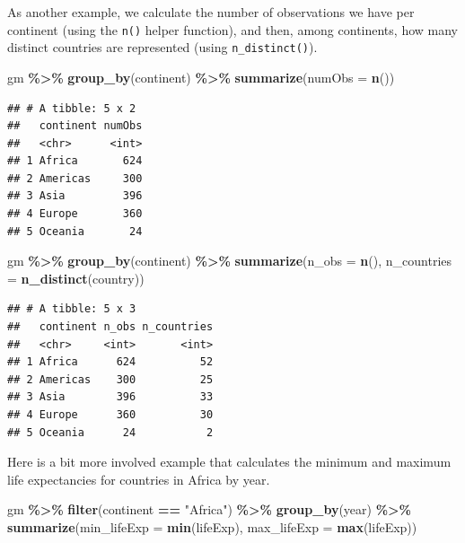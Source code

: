 \documentclass[
]{krantz}
\newenvironment{Shaded}{\begin{snugshade}}{\end{snugshade}}
\newcommand{\DataTypeTok}[1]{\textcolor[rgb]{0.13,0.29,0.53}{#1}}
\newcommand{\KeywordTok}[1]{\textcolor[rgb]{0.13,0.29,0.53}{\textbf{#1}}}
\newcommand{\NormalTok}[1]{#1}
\newcommand{\OperatorTok}[1]{\textcolor[rgb]{0.81,0.36,0.00}{\textbf{#1}}}
\newcommand{\StringTok}[1]{\textcolor[rgb]{0.31,0.60,0.02}{#1}}
\begin{document}
As another example, we calculate the number of observations we have per continent (using the \texttt{n()} helper function), and then, among continents, how many distinct countries are represented (using \texttt{n\_distinct()}).

\begin{Shaded}
\begin{Highlighting}[]
\NormalTok{gm }\OperatorTok{\%\textgreater{}\%}\StringTok{ }
\StringTok{  }\KeywordTok{group\_by}\NormalTok{(continent) }\OperatorTok{\%\textgreater{}\%}\StringTok{ }
\StringTok{  }\KeywordTok{summarize}\NormalTok{(}\DataTypeTok{numObs =} \KeywordTok{n}\NormalTok{())}
\end{Highlighting}
\end{Shaded}

\begin{verbatim}
## # A tibble: 5 x 2
##   continent numObs
##   <chr>      <int>
## 1 Africa       624
## 2 Americas     300
## 3 Asia         396
## 4 Europe       360
## 5 Oceania       24
\end{verbatim}

\begin{Shaded}
\begin{Highlighting}[]
\NormalTok{gm }\OperatorTok{\%\textgreater{}\%}
\StringTok{  }\KeywordTok{group\_by}\NormalTok{(continent) }\OperatorTok{\%\textgreater{}\%}
\StringTok{  }\KeywordTok{summarize}\NormalTok{(}\DataTypeTok{n\_obs =} \KeywordTok{n}\NormalTok{(), }\DataTypeTok{n\_countries =} \KeywordTok{n\_distinct}\NormalTok{(country))}
\end{Highlighting}
\end{Shaded}

\begin{verbatim}
## # A tibble: 5 x 3
##   continent n_obs n_countries
##   <chr>     <int>       <int>
## 1 Africa      624          52
## 2 Americas    300          25
## 3 Asia        396          33
## 4 Europe      360          30
## 5 Oceania      24           2
\end{verbatim}

Here is a bit more involved example that calculates the minimum and maximum life expectancies for countries in Africa by year.

\begin{Shaded}
\begin{Highlighting}[]
\NormalTok{gm }\OperatorTok{\%\textgreater{}\%}
\StringTok{  }\KeywordTok{filter}\NormalTok{(continent }\OperatorTok{==}\StringTok{ "Africa"}\NormalTok{) }\OperatorTok{\%\textgreater{}\%}
\StringTok{  }\KeywordTok{group\_by}\NormalTok{(year) }\OperatorTok{\%\textgreater{}\%}
\StringTok{  }\KeywordTok{summarize}\NormalTok{(}\DataTypeTok{min\_lifeExp =} \KeywordTok{min}\NormalTok{(lifeExp), }\DataTypeTok{max\_lifeExp =} \KeywordTok{max}\NormalTok{(lifeExp))}
\end{Highlighting}
\end{Shaded}
\end{document}
